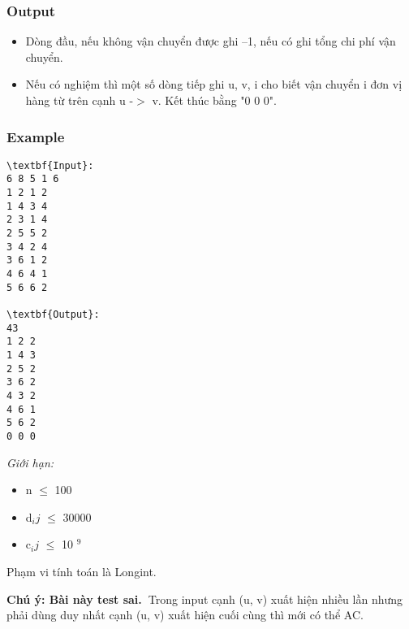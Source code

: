 \subsubsection{Output}
\begin{itemize}
	\item Dòng đầu, nếu không vận chuyển được ghi –1, nếu có ghi tổng chi phí vận chuyển.
	\item Nếu có nghiệm thì một số dòng tiếp ghi u, v, i cho biết vận chuyển i đơn vị hàng từ trên cạnh u -$>$ v. Kết thúc bằng "0 0 0".
\end{itemize}

\subsubsection{Example}
\begin{verbatim}
\textbf{Input}:
6 8 5 1 6
1 2 1 2
1 4 3 4
2 3 1 4
2 5 5 2
3 4 2 4
3 6 1 2
4 6 4 1
5 6 6 2

\textbf{Output}:
43
1 2 2
1 4 3
2 5 2
3 6 2
4 3 2
4 6 1
5 6 2
0 0 0

\end{verbatim}

\emph{Giới hạn: }
\begin{itemize}
	\item n  $\le$  100
	\item d$_ij $  $\le$  30000
	\item c$_ij $  $\le$  10 $^ 9 $
\end{itemize}

Phạm vi tính toán là Longint.

\textbf{Chú ý: Bài này test sai. }Trong input cạnh (u, v) xuất hiện nhiều lần nhưng phải dùng duy nhất cạnh (u, v) xuất hiện cuối cùng thì mới có thể AC.
